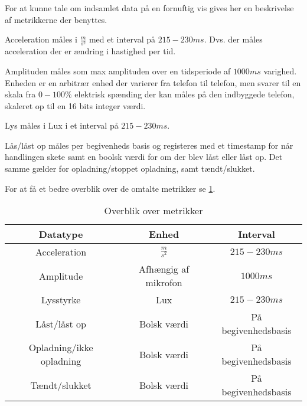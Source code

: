 For at kunne tale om indsamlet data på en fornuftig vis gives her en beskrivelse af metrikkerne der benyttes.

Acceleration måles i $\frac{m}{s^2}$ med et interval på $215-230 ms$.
Dvs. der måles acceleration der er ændring i hastighed per tid.

Amplituden måles som max amplituden over en tidsperiode af $1000ms$ varighed.
Enheden er en arbitrær enhed der varierer fra telefon til telefon, men svarer til en skala fra $0-100\%$ elektrisk spænding der kan måles på den indbyggede telefon, skaleret op til en 16 bits integer værdi.

Lys måles i Lux i et interval på $215-230 ms$.

Lås/låst op måles per begivenheds basis og registeres med et timestamp for når handlingen skete samt en boolsk værdi for om der blev låst eller låst op.
Det samme gælder for opladning/stoppet opladning, samt tændt/slukket.

For at få et bedre overblik over de omtalte metrikker se \cref{tab:metrikker}.

\begin{table}[h]
\begin{tabular}{|c|c|c|}
	\hline Datatype & Enhed & Interval \\ 
	\hline Acceleration & $\frac{m}{s^2}$ & $215-230ms$ \\ 
	\hline Amplitude & Afhængig af mikrofon & $1000ms$ \\ 
	\hline Lysstyrke & Lux & $215-230ms$ \\ 
	\hline Låst/låst op & Bolsk værdi & På begivenhedsbasis \\ 
	\hline Opladning/ikke opladning & Bolsk værdi & På begivenhedsbasis \\ 
	\hline Tændt/slukket & Bolsk værdi & På begivenhedsbasis \\ 
	\hline 
\end{tabular}
\caption{Overblik over metrikker}\label{tab:metrikker} 
\end{table}